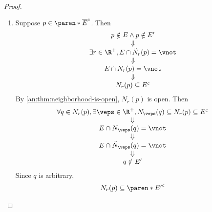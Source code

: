 \begin{proof}
  \leavevmode\par
  \begin{enumerate}[label=\textbf{(\Alph*)}]
    \item Suppose $p \in \paren*{\overline{E}}^{c}$. Then
          \[
            \begin{array}{c}
              p \notin E \land p \notin E'                              \\
              \Downarrow                                                \\
              \exists r \in \R^{+}, E \cap \widetilde{N}_{r}(p) = \vnot \\
              \Downarrow                                                \\
              E \cap N_{r}(p) = \vnot                                   \\
              \Downarrow                                                \\
              N_{r}(p) \subseteq E^{c}
            \end{array}
          \]
          By \cref{an:thm:neighborhood-is-open}, $N_{r}(p)$ is open. Then
          \[
            \begin{array}{c}
              \forall q \in N_{r}(p), \exists \veps \in \R^{+}, N_{\veps}(q) \subseteq N_{r}(p) \subseteq E^{c} \\
              \Downarrow                                                                                        \\
              E \cap N_{\veps}(q) = \vnot                                                                       \\
              \Downarrow                                                                                        \\
              E \cap \widetilde{N}_{\veps}(q) = \vnot                                                           \\
              \Downarrow                                                                                        \\
              q \notin E'
            \end{array}
          \]
          Since $q$ is arbitrary,
          \[
            \begin{array}{c}
              N_{r}(p) \subseteq \paren*{E'}^{c}                                        \\

\end{array}\]
\end{enumerate}
\end{proof}
